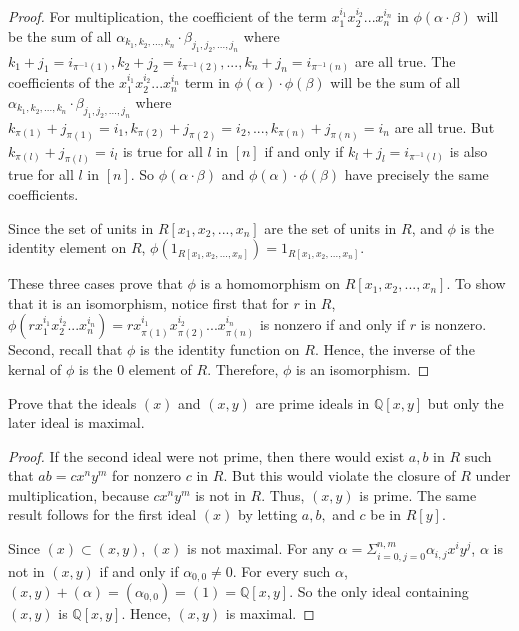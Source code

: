 \documentclass[10pt]{article}
\newenvironment{problem}[2][Problem]{\begin{trivlist}
		\item[\hskip \labelsep {\bfseries #1}\hskip \labelsep {\bfseries #2.}]}{\end{trivlist}}
\begin{document}
\begin{problem}{1.3}
\begin{proof}
			For multiplication, the coefficient of the term $x_1^{i_1}x_2^{i_2}...x_n^{i_n}$ in $\phi(\alpha \cdot \beta)$ will be the sum of all $\alpha_{k_1, k_2, ... , k_n} \cdot \beta_{j_1, j_2, ... , j_n}$ where $k_1 + j_1 = i_{\pi^{-1}(1)}, k_2 + j_2 = i_{\pi^{-1}(2)},..., k_n+j_n=i_{\pi^{-1}(n)}$ are all true. The coefficients of the $x_1^{i_1}x_2^{i_2}...x_n^{i_n}$ term in $\phi(\alpha) \cdot \phi(\beta)$ will be the sum of all  $\alpha_{k_1, k_2, ... , k_n} \cdot \beta_{j_1, j_2, ... , j_n}$ where $k_{\pi(1)} + j_{\pi(1)} = i_1, k_{\pi(2)} + j_{\pi(2)} = i_2,..., k_{\pi(n)} + j_{\pi(n)} =i_n$ are all true. But $k_{\pi(l)} + j_{\pi(l)} = i_l$ is true for all $l$ in $[n]$ if and only if $k_l + j_l = i_{\pi^{-1}(l)}$ is also true for all $l$ in $[n]$. So $\phi(\alpha \cdot \beta)$ and $\phi(\alpha) \cdot \phi(\beta)$ have precisely the same coefficients.
			
			Since the set of units in $R[x_{1}, x_{2}, ... , x_{n}]$ are the set of units in $R$, and $\phi$ is the identity element on $R$, $\phi(1_{R[x_{1}, x_{2}, ... , x_{n}]}) = 1_{R[x_{1}, x_{2}, ... , x_{n}]}$.
			
			These three cases prove that $\phi$ is a homomorphism on $R[x_{1}, x_{2}, ... , x_{n}]$. To show that it is an isomorphism, notice first that for $r$ in $R$, $\phi(rx_{1}^{i_1}x_{2}^{i_2}...x_{n}^{i_n})=rx_{\pi(1)}^{i_1}x_{\pi(2)}^{i_2}...x_{\pi(n)}^{i_n}$ is nonzero if and only if $r$ is nonzero. Second, recall that $\phi$ is the identity function on $R$. Hence, the inverse of the kernal of $\phi$ is the $0$ element of $R$. Therefore, $\phi$ is an isomorphism.
		\end{proof}
	\end{problem}
	
	\begin{problem}{1.4}
		Prove that the ideals $(x)$ and $(x,y)$ are prime ideals in $\mathbb{Q}[x,y]$ but only the later ideal is maximal.
		\begin{proof}
			If the second ideal were not prime, then there would exist $a,b$ in $R$ such that $ab=cx^ny^m$ for nonzero $c$ in $R$. But this would violate the closure of $R$ under multiplication, because $cx^ny^m$ is not in $R$. Thus, $(x,y)$ is prime. The same result follows for the first ideal $(x)$ by letting $a,b,$ and $c$ be in $R[y]$.
			
			Since $(x) \subset (x,y)$, $(x)$ is not maximal. For any $\alpha = \Sigma^{n, m}_{i=0, j=0} \alpha_{i,j}x^iy^j$, $\alpha$ is not in $(x,y)$ if and only if $\alpha_{0,0} \not = 0$. For every such $\alpha$, $(x,y) + (\alpha) = (\alpha_{0,0}) = (1) = \mathbb{Q}[x,y]$. So the only ideal containing $(x,y)$ is $\mathbb{Q}[x,y]$. Hence, $(x,y)$ is maximal.
			
		\end{proof}	
	\end{problem} 
	
\end{document}
